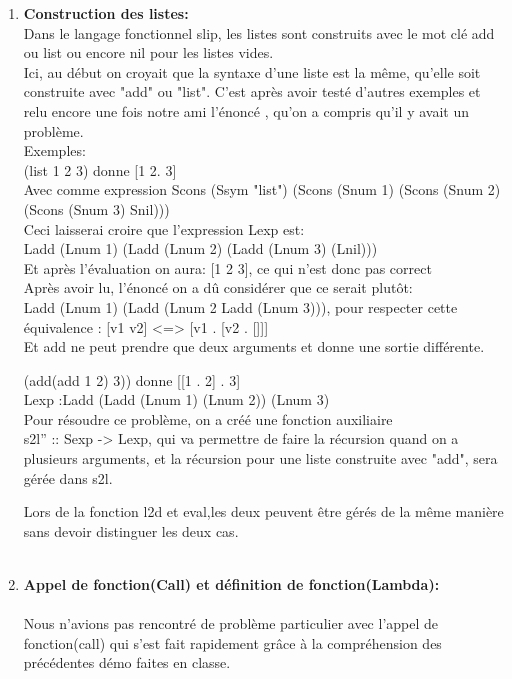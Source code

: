 \documentclass{article}
\begin{document}
\begin{enumerate}
    \item 
    \textbf{Construction des listes:}\\
    Dans le langage fonctionnel slip, les listes sont construits avec le mot clé add ou list ou encore nil pour les listes vides.\\
    Ici, au début on croyait que la syntaxe d'une liste est la même, qu'elle soit construite avec "add" ou "list". C'est après avoir testé d'autres exemples et relu encore une fois notre ami l'énoncé , qu'on a compris qu'il y avait un problème.\\
    Exemples:\\
      
      (list 1 2 3) donne  [1 2. 3]\\
      Avec comme expression Scons (Ssym "list") (Scons (Snum 1) (Scons (Snum 2) (Scons (Snum 3) Snil)))\\
      
      Ceci laisserai croire que l'expression Lexp est:\\ Ladd (Lnum 1) (Ladd (Lnum 2) (Ladd (Lnum 3) (Lnil)))\\
      
      Et après l'évaluation on aura: [1 2 3], ce qui n'est donc pas correct\\
      
     Après avoir lu, l'énoncé on a dû considérer que ce serait plutôt:\\
      Ladd (Lnum 1) (Ladd (Lnum 2 Ladd (Lnum 3))), pour respecter cette équivalence : [v1 v2] <=>  [v1 . [v2 . []]]\\
      
     Et add ne peut prendre que deux arguments et donne une sortie différente.
    
    (add(add 1 2) 3)) donne [[1 . 2] . 3] \\Lexp :Ladd (Ladd (Lnum 1) (Lnum 2)) (Lnum 3) \\
    
    Pour résoudre ce problème, on a créé une fonction auxiliaire\\
    s2l'' :: Sexp -> Lexp, qui va permettre de faire la récursion quand on a plusieurs arguments, et la récursion pour une liste construite avec "add", sera gérée dans s2l.
    
    Lors de la fonction l2d et eval,les deux peuvent être gérés de la même manière sans devoir distinguer les deux cas.\\
    \\
\item
     \textbf{Appel de fonction(Call) et définition de fonction(Lambda):}\\ 
    \\
    Nous n’avions pas rencontré de problème particulier avec l’appel de fonction(call) qui s’est fait rapidement grâce à la compréhension des précédentes démo faites en classe.\\
    

\end{enumerate}
\end{document}
